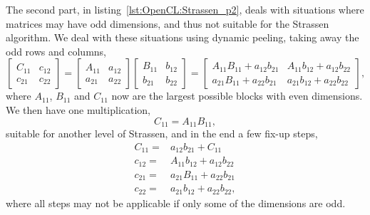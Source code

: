 The second part, in listing~\ref{lst:OpenCL:Strassen_p2}, deals with situations where matrices may have odd dimensions, and thus not suitable for the Strassen algorithm.
We deal with these situations using dynamic peeling, taking away the odd rows and columns, 
\begin{equation}
\begin{bmatrix}
C_{11}  & c_{12} \\
c_{21}  & c_{22}
\end{bmatrix}
=
\begin{bmatrix}
A_{11} & a_{12} \\
a_{21} & a_{22} 
\end{bmatrix}
\begin{bmatrix}
B_{11} & b_{12} \\
b_{21} & b_{22} 
\end{bmatrix}
= 
\begin{bmatrix}
A_{11}B_{11} + a_{12}b_{21}  & A_{11}b_{12} + a_{12}b_{22} \\
a_{21}B_{11} + a_{22}b_{21}  & a_{21}b_{12} + a_{22}b_{22} 
\end{bmatrix} , 
\end{equation}
where $A_{11}$, $B_{11}$ and $C_{11}$ now are the largest possible blocks with even dimensions.
We then have one multiplication,
\begin{equation}
C_{11} = A_{11}B_{11} , 
\end{equation}
suitable for another level of Strassen, and in the end a few fix-up steps,
\begin{equation}
\begin{split}
C_{11} =&  a_{12}b_{21}  + C_{11} \\
c_{12} =& A_{11}b_{12} + a_{12}b_{22} \\
c_{21} =& a_{21}B_{11} + a_{22}b_{21} \\
c_{22} =& a_{21}b_{12} + a_{22}b_{22} ,
\end{split}
\end{equation}
where all steps may not be applicable if only some of the dimensions are odd.
